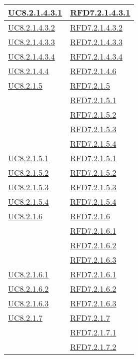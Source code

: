 \begin{longtable}{|>{\centering}m{5cm}|m{5cm}<{\centering}|}
\hyperref[UC8.2.1.4.3.1]{UC8.2.1.4.3.1} & \hyperlink{RFD7.2.1.4.3.1}{RFD7.2.1.4.3.1}\\ \hline
\hyperref[UC8.2.1.4.3.2]{UC8.2.1.4.3.2} & \hyperlink{RFD7.2.1.4.3.2}{RFD7.2.1.4.3.2}\\ \hline
\hyperref[UC8.2.1.4.3.3]{UC8.2.1.4.3.3} & \hyperlink{RFD7.2.1.4.3.3}{RFD7.2.1.4.3.3}\\ \hline
\hyperref[UC8.2.1.4.3.4]{UC8.2.1.4.3.4} & \hyperlink{RFD7.2.1.4.3.4}{RFD7.2.1.4.3.4}\\ \hline
\hyperref[UC8.2.1.4.4]{UC8.2.1.4.4} & \hyperlink{RFD7.2.1.4.6}{RFD7.2.1.4.6}\\ \hline
\hyperref[UC8.2.1.5]{UC8.2.1.5} & \hyperlink{RFD7.2.1.5}{RFD7.2.1.5}\\
& \hyperlink{RFD7.2.1.5.1}{RFD7.2.1.5.1}\\
& \hyperlink{RFD7.2.1.5.2}{RFD7.2.1.5.2}\\
& \hyperlink{RFD7.2.1.5.3}{RFD7.2.1.5.3}\\
& \hyperlink{RFD7.2.1.5.4}{RFD7.2.1.5.4}\\ \hline
\hyperref[UC8.2.1.5.1]{UC8.2.1.5.1} & \hyperlink{RFD7.2.1.5.1}{RFD7.2.1.5.1}\\ \hline
\hyperref[UC8.2.1.5.2]{UC8.2.1.5.2} & \hyperlink{RFD7.2.1.5.2}{RFD7.2.1.5.2}\\ \hline
\hyperref[UC8.2.1.5.3]{UC8.2.1.5.3} & \hyperlink{RFD7.2.1.5.3}{RFD7.2.1.5.3}\\ \hline
\hyperref[UC8.2.1.5.4]{UC8.2.1.5.4} & \hyperlink{RFD7.2.1.5.4}{RFD7.2.1.5.4}\\ \hline
\hyperref[UC8.2.1.6]{UC8.2.1.6} & \hyperlink{RFD7.2.1.6}{RFD7.2.1.6}\\
& \hyperlink{RFD7.2.1.6.1}{RFD7.2.1.6.1}\\
& \hyperlink{RFD7.2.1.6.2}{RFD7.2.1.6.2}\\
& \hyperlink{RFD7.2.1.6.3}{RFD7.2.1.6.3}\\ \hline
\hyperref[UC8.2.1.6.1]{UC8.2.1.6.1} & \hyperlink{RFD7.2.1.6.1}{RFD7.2.1.6.1}\\ \hline
\hyperref[UC8.2.1.6.2]{UC8.2.1.6.2} & \hyperlink{RFD7.2.1.6.2}{RFD7.2.1.6.2}\\ \hline
\hyperref[UC8.2.1.6.3]{UC8.2.1.6.3} & \hyperlink{RFD7.2.1.6.3}{RFD7.2.1.6.3}\\ \hline
\hyperref[UC8.2.1.7]{UC8.2.1.7} & \hyperlink{RFD7.2.1.7}{RFD7.2.1.7}\\
& \hyperlink{RFD7.2.1.7.1}{RFD7.2.1.7.1}\\
& \hyperlink{RFD7.2.1.7.2}{RFD7.2.1.7.2}\\

\end{longtable}
